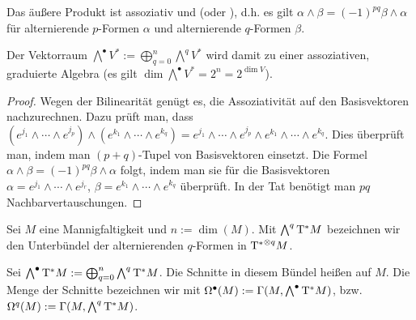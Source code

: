 \begin{st} \label{6.6}
    Das äußere Produkt ist assoziativ und  (oder ), d.h. es gilt
    \begin{math}
        \alpha \wedge \beta = (-1)^{pq} \beta \wedge \alpha
    \end{math}
    für alternierende $p$-Formen $\alpha$ und alternierende $q$-Formen $\beta$.

    Der Vektorraum $\bigwedge^{\bullet} V^\ast := \bigoplus_{q=0}^n \bigwedge^q V^*$ wird damit zu einer assoziativen, graduierte Algebra (es gilt $\dim \bigwedge^\bullet V^\ast = 2^n = 2^{\dim V}$).
    \begin{proof}
        Wegen der Bilinearität genügt es, die Assoziativität auf den Basisvektoren nachzurechnen.
        Dazu prüft man, dass
        \begin{math}
            (e^{j_1} \wedge \dotsb \wedge e^{j_p}) \wedge (e^{k_1} \wedge \dotsb \wedge e^{k_q})
            = e^{j_1} \wedge \dotsb \wedge e^{j_p} \wedge e^{k_1} \wedge \dotsb \wedge e^{k_q}.
        \end{math}
        Dies überprüft man, indem man $(p+q)$-Tupel von Basisvektoren einsetzt.
        Die Formel $\alpha \wedge \beta = (-1)^{pq} \beta \wedge \alpha$ folgt, indem man sie für die Basisvektoren $\alpha = e^{j_1} \wedge \dotsb \wedge e^{j_r}$, $\beta = e^{k_1} \wedge \dotsb \wedge e^{k_q}$ überprüft.
        In der Tat benötigt man $pq$ Nachbarvertauschungen.
    \end{proof}
\end{st}

\begin{df} \label{6.7}
    Sei $M$ eine Mannigfaltigkeit und $n := \dim(M)$.
    Mit $\bigwedge^q \mathrm{T}^* M$ bezeichnen wir den Unterbündel der alternierenden $q$-Formen in ${\mathrm{T}^*}^{\otimes q} M$.

    Sei $\bigwedge^\bullet \mathrm{T}^* M := \bigoplus_{q=0}^n \bigwedge^q \mathrm{T}^* M$.
    Die Schnitte in diesem Bündel heißen  auf $M$.
    Die Menge der Schnitte bezeichnen wir mit $\Omega^\bullet(M) := \Gamma(M, \bigwedge^\bullet \mathrm{T}^* M)$, bzw. $\Omega^q(M) := \Gamma(M, \bigwedge^q \mathrm{T}^* M)$.
\end{df}


